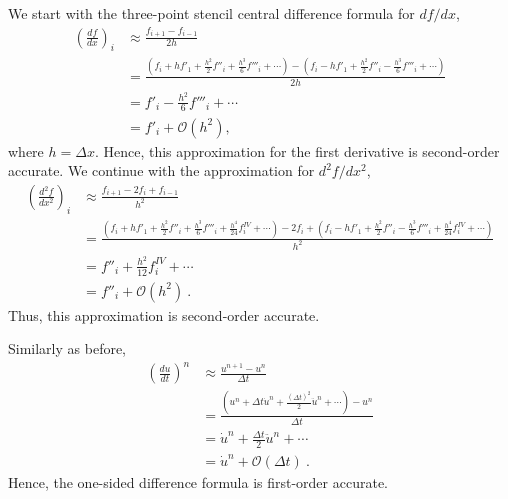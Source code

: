 \begin{questions}


\begin{solution}

We start with the three-point stencil central difference formula for $df/dx$,
\begin{align*}
\left(\frac{df}{dx}\right)_i &\approx \frac{f_{i+1}-f_{i-1}}{2h} \\
& = \frac{\left(f_i + hf'_1 + \frac{h^2}{2}f''_i + \frac{h^3}{6}f'''_i + \cdots  \right) - \left(f_i - hf'_1 + \frac{h^2}{2}f''_i - \frac{h^3}{6}f'''_i + \cdots  \right)}{2h} \\
& = f'_i -\frac{h^2}{6}f'''_i + \cdots \\
& = f'_i + \mathcal{O}(h^2),
\end{align*}
where $h = \Delta x$. Hence, this approximation for the first derivative is second-order accurate. We continue with the approximation for $d^2 f/dx^2$,
\begin{align*}
\left(\frac{d^2f}{dx^2}\right)_i &\approx \frac{f_{i+1} -2f_{i} + f_{i-1}}{h^2} \\
& = \frac{\left(f_i + hf'_1 + \frac{h^2}{2}f''_i + \frac{h^3}{6}f'''_i + \frac{h^4}{24}f^{IV}_i + \cdots  \right) -2f_i + \left(f_i - hf'_1 + \frac{h^2}{2}f''_i - \frac{h^3}{6}f'''_i + \frac{h^4}{24}f^{IV}_i + \cdots  \right)}{h^2} \\
& = f''_i + \frac{h^2}{12}f^{IV}_i + \cdots \\
& = f''_i + \mathcal{O}(h^2)~.
\end{align*}
Thus, this approximation is second-order accurate.
\end{solution}


\begin{solution}
Similarly as before,
\begin{align*}
\left(\frac{du}{dt}\right)^n &\approx \frac{u^{n+1} - u^n}{\Delta t} \\
& = \frac{\left(u^n + \Delta t \dot{u}^n + \frac{(\Delta t)^2}{2}\ddot{u}^n + \cdots \right) - u^n}{\Delta t} \\
& = \dot{u}^n + \frac{\Delta t}{2}\ddot{u}^n + \cdots \\
& = \dot{u}^n + \mathcal{O}(\Delta t)~.
\end{align*}
Hence, the one-sided difference formula is first-order accurate.
\end{solution}

\end{questions}
